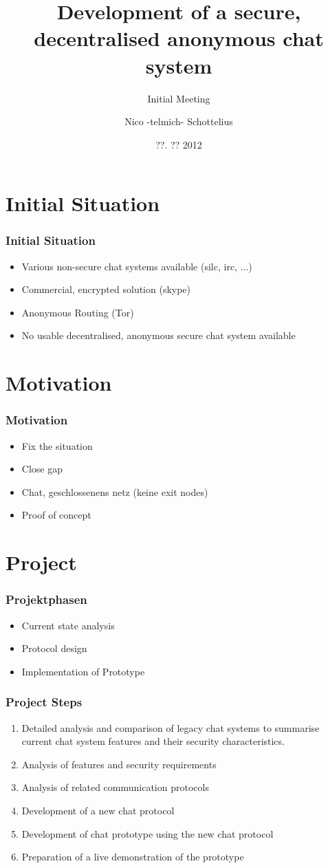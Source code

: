 \documentclass{beamer}
\title{Development of a secure, decentralised anonymous chat system}
\subtitle{Initial Meeting}
\author{Nico -telmich- Schottelius}
\date{??. ?? 2012}
\begin{document}
\frame{\titlepage}

\frame{\tableofcontents}

\section{Initial Situation}

\frame
{
  \frametitle{Initial Situation}
  \begin{itemize}
  \item Various non-secure chat systems available (silc, irc, ...)
  \item Commercial, encrypted solution (skype)
  \item Anonymous Routing (Tor)
  \item No usable decentralised, anonymous secure chat system available
  \end{itemize}
}

\section{Motivation}
\frame
{
  \frametitle{Motivation}
  \begin{itemize}
     \item Fix the situation
     \item Close gap
     \item Chat, geschlossenens netz (keine exit nodes)
     \item Proof of concept
  \end{itemize}
}

\section{Project}
\frame
{
  \frametitle{Projektphasen}
  \begin{itemize}
     \item Current state analysis
     \item Protocol design
     \item Implementation of Prototype
  \end{itemize}
}

\frame
{
  \frametitle{Project Steps}
  \begin{enumerate}
     \item Detailed analysis and comparison of legacy chat systems
        to summarise current chat system features and their
        security characteristics.
    \item Analysis of features and security requirements
    \item Analysis of related communication protocols
    \item Development of a new chat protocol
    \item Development of chat prototype using the new chat protocol
    \item Preparation of a live demonstration of the prototype
  \end{enumerate}
}
\end{document}
